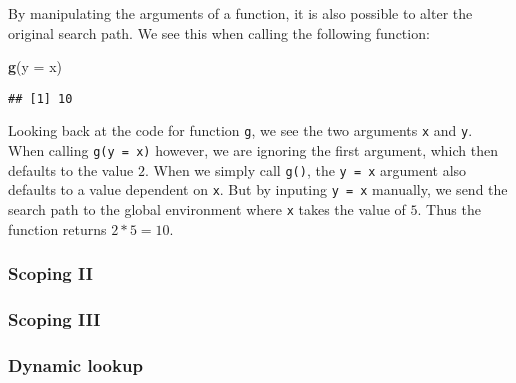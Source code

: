 \documentclass[11,]{article}
\newenvironment{Shaded}{\begin{snugshade}}{\end{snugshade}}
\newcommand{\KeywordTok}[1]{\textcolor[rgb]{0.13,0.29,0.53}{\textbf{{#1}}}}
\newcommand{\DataTypeTok}[1]{\textcolor[rgb]{0.13,0.29,0.53}{{#1}}}
\newcommand{\NormalTok}[1]{{#1}}
\begin{document}
By manipulating the arguments of a function, it is also possible to
alter the original search path. We see this when calling the following
function:

\begin{Shaded}
\begin{Highlighting}[]
\KeywordTok{g}\NormalTok{(}\DataTypeTok{y =} \NormalTok{x)}
\end{Highlighting}
\end{Shaded}

\begin{verbatim}
## [1] 10
\end{verbatim}

Looking back at the code for function \texttt{g}, we see the two
arguments \texttt{x} and \texttt{y}. When calling \texttt{g(y\ =\ x)}
however, we are ignoring the first argument, which then defaults to the
value \(2\). When we simply call \texttt{g()}, the \texttt{y\ =\ x}
argument also defaults to a value dependent on \texttt{x}. But by
inputing \texttt{y\ =\ x} manually, we send the search path to the
global environment where \texttt{x} takes the value of \(5\). Thus the
function returns \(2*5=10\).

\subsubsection{Scoping II}\label{scoping-ii}

\subsubsection{Scoping III}\label{scoping-iii}

\subsubsection{Dynamic lookup}\label{dynamic-lookup}
\end{document}
